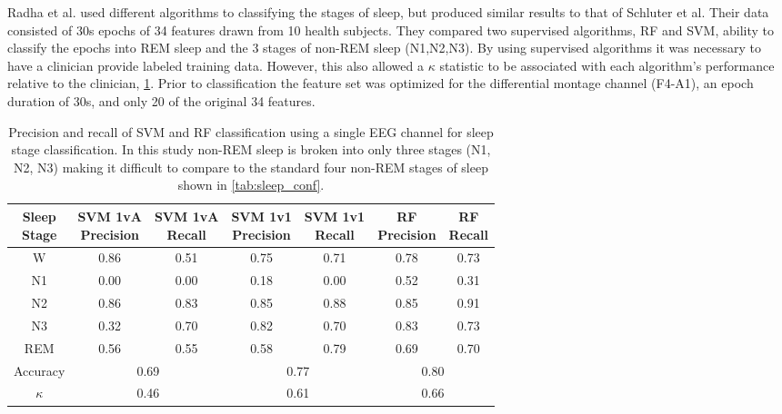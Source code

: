 Radha et al. \cite{Radha2014} used different algorithms to classifying the stages of sleep, but produced similar results to that of Schluter et al. Their data consisted of 30s epochs of 34 features drawn from 10 health subjects. They compared two supervised algorithms, \ac{RF} and \ac{SVM}, ability to classify the epochs into \ac{REM} sleep and the 3 stages of non-\ac{REM} sleep (N1,N2,N3). By using supervised algorithms it was necessary to have a clinician provide labeled training data. However, this also allowed a $\kappa$ statistic to be associated with each algorithm's performance relative to the clinician, \cref{tab:radha}. Prior to classification the feature set was optimized for the differential montage channel (F4-A1), an epoch duration of 30s, and only 20 of the original 34 features.

\begin{table}[ht]
\caption[Single EEG Channel Sleep Scoring]{Precision and recall of SVM and RF classification using a single EEG channel for sleep stage classification. In this study non-REM sleep is broken into only three stages (N1, N2, N3) making it difficult to compare to the standard four non-REM stages of sleep shown in \cref{tab:sleep_conf}.}
\centering
\begin{tabular}{c | c c c c c c}
\toprule
\makecell{Sleep\\Stage} & \makecell{SVM 1vA\\Precision} & \makecell{SVM 1vA\\Recall} & \makecell{SVM 1v1\\Precision} & \makecell{SVM 1v1\\Recall} & \makecell{RF\\Precision} & \makecell{RF\\Recall}\\
\midrule
W 		& 0.86 & 0.51 & 0.75 & 0.71 & 0.78 & 0.73 \\
N1		& 0.00 & 0.00 & 0.18 & 0.00 & 0.52 & 0.31 \\
N2		& 0.86 & 0.83 & 0.85 & 0.88 & 0.85 & 0.91 \\
N3		& 0.32 & 0.70 & 0.82 & 0.70 & 0.83 & 0.73 \\
REM 	& 0.56 & 0.55 & 0.58 & 0.79 & 0.69 & 0.70 \\
\midrule
Accuracy & \multicolumn{2}{c}{0.69} & \multicolumn{2}{c}{0.77} & \multicolumn{2}{c}{0.80} \\
$\kappa$ & \multicolumn{2}{c}{0.46} & \multicolumn{2}{c}{0.61} & \multicolumn{2}{c}{0.66} \\
\bottomrule
\end{tabular}
\label{tab:radha}
\end{table}

